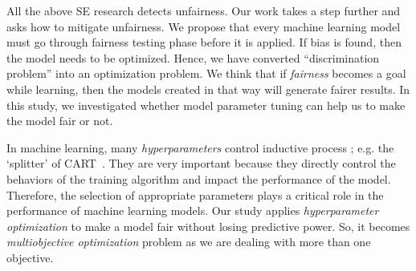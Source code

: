 \documentclass{NSF}
\begin{document}
\begin{nsfdescription}
All the above SE research detects unfairness. Our work takes a step further and asks how to mitigate
unfairness. We propose that every machine learning model must go through fairness testing phase before it is applied. If bias is found, then the model needs to be optimized. Hence, we have converted ``discrimination problem'' into an optimization problem. We think that if \textit{fairness} becomes a goal while learning, then the  models created in that way will generate fairer results. In this study, we investigated whether model parameter tuning can help us to make the model fair or not. 
 
 In machine learning, many  {\em hyperparameters} control   inductive process ; e.g. the   `splitter' of CART~\cite{breiman2017classification}.  They are very important because they directly control the behaviors of the training algorithm and impact the performance of the model. Therefore, the selection of appropriate parameters plays a critical role in the performance of machine learning models. Our study applies \textit{hyperparameter optimization} to make a model fair without losing predictive power. So, it becomes \textit{multiobjective optimization} problem as we are dealing with more than one objective. 
 

\end{nsfdescription}
\end{document}
